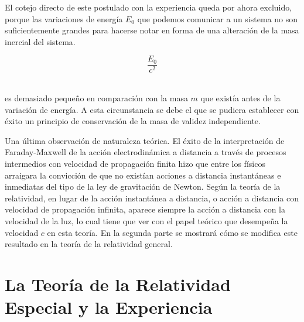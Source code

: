 \documentclass[spanish]{book}
\begin{document}
El cotejo directo de este postulado con la experiencia queda por ahora excluido,
porque las variaciones de energía $E_{0}$ que podemos comunicar a un sistema no son
suficientemente grandes para hacerse notar en forma de una alteración de la masa
inercial del sistema.

\[\frac{E_{0}}{c^{2}}\]
 ~

\noindent es demasiado pequeño en comparación con la masa $m$ que existía antes de la
variación de energía. A esta circunstancia se debe el que se pudiera establecer con
éxito un principio de conservación de la masa de validez independiente.

Una última observación de naturaleza teórica. El éxito de la interpretación de
Faraday-Maxwell de la acción electrodinámica a distancia a través de procesos
intermedios con velocidad de propagación finita hizo que entre los físicos arraigara la
convicción de que no existían acciones a distancia instantáneas e inmediatas del tipo de
la ley de gravitación de Newton. Según la teoría de la relatividad, en lugar de la acción
instantánea a distancia, o acción a distancia con velocidad de propagación infinita,
aparece siempre la acción a distancia con la velocidad de la luz, lo cual tiene que ver
con el papel teórico que desempeña la velocidad $c$ en esta teoría. En la segunda parte
se mostrará cómo se modifica este resultado en la teoría de la relatividad general.


\chapter{La Teoría de la Relatividad Especial y la Experiencia}
\end{document}
